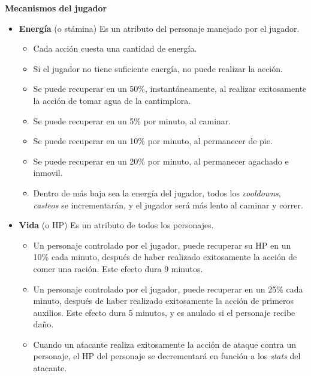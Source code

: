 \item \textbf{Mecanismos del jugador}
  \begin{itemize} %

  \item \textbf{Energía} \indispensable (o stámina) Es un atributo del personaje manejado por el jugador.
    
    \begin{itemize} %
    \item \indispensable Cada acción cuesta una cantidad de energía.
    \item \indispensable Si el jugador no tiene suficiente energía, no puede realizar la acción.
    \item \indispensable Se puede recuperar en un 50\%, instantáneamente, al realizar exitosamente la acción de tomar agua de la cantimplora.
    \item \talvez Se puede recuperar en un 5\% por minuto, al caminar.
    \item \talvez Se puede recuperar en un 10\% por minuto, al permanecer de pie.
    \item \talvez Se puede recuperar en un 20\% por minuto, al permanecer agachado e inmovil.
    \item \talvez Dentro de más baja sea la energía del jugador, todos los \textit{cooldowns}, \textit{casteos} se incrementarán, y el jugador será más lento al caminar y correr.
    \end{itemize} %

  \item \textbf{Vida} \indispensable (o HP) Es un atributo de todos los personajes.

    \begin{itemize} %
    \item \indispensable Un personaje controlado por el jugador, puede recuperar su HP en un 10\% cada minuto, después de haber realizado exitosamente la acción de comer una ración. Este efecto dura 9 minutos.

    \item \talvez Un personaje controlado por el jugador, puede recuperar en un 25\% cada minuto, después de haber realizado exitosamente la acción de primeros auxilios. Este efecto dura 5 minutos, y es anulado si el personaje recibe daño.

    \item \indispensable Cuando un atacante realiza exitosamente la acción de ataque contra un personaje, el HP del personaje se decrementará en función a los \textit{stats} del atacante.
    \end{itemize} %
  \end{itemize}
